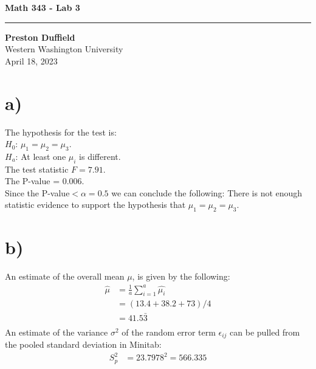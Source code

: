 \documentclass{article}
\begin{document}
\noindent
\begin{minipage}[t]{0.6\textwidth}
    \begin{flushleft}
        \LARGE\textbf{Math 343 - Lab 3} \\
        \vspace{6pt} %
        \hrule width 10cm
        \vspace{12pt}
        \large\textbf{Preston Duffield} \\
        \large Western Washington University \\
        April 18, 2023
        \vspace{24pt}
    \end{flushleft}
\end{minipage}

\section*{a)}
The hypothesis for the test is: \\
$H_0$: $\mu_1 = \mu_2 = \mu_3$. \\
$H_a$: At least one $\mu_i$ is different. \\
The test statistic $F = 7.91$. \\
The P-value = 0.006. \\
Since the P-value$< \alpha = 0.5$ we can conclude the following:
There is not enough statistic evidence to support the hypothesis that
$\mu_1 = \mu_2 = \mu_3$.

\section*{b)}
An estimate of the overall mean $\mu$, is given by the following:
\begin{align*}
    \hat{\mu} &= \frac{1}{a} \sum_{i=1}^{a} \hat{\mu_i} \\
              &= (13.4 + 38.2 + 73) / 4 \\
              &= 41.5\bar{3} \\
\end{align*}
An estimate of the variance $\sigma^2$ of the random error term
$\epsilon_{ij}$ can be pulled from the pooled standard deviation in Minitab:
\begin{align*}
    S_p ^2 &= 23.7978^2 = 566.335
\end{align*}

\clearpage
\end{document}
